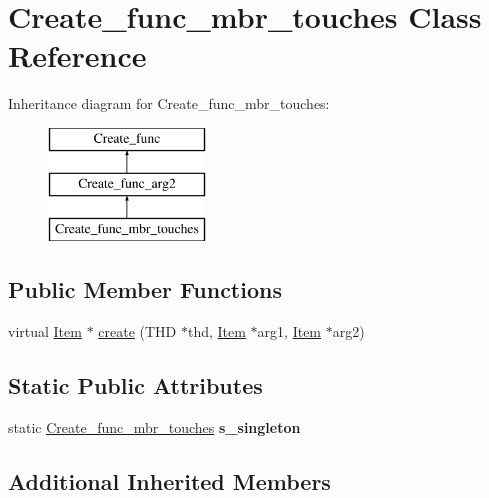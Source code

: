 \hypertarget{classCreate__func__mbr__touches}{}\section{Create\+\_\+func\+\_\+mbr\+\_\+touches Class Reference}
\label{classCreate__func__mbr__touches}
Inheritance diagram for Create\+\_\+func\+\_\+mbr\+\_\+touches\+:\begin{figure}[H]
\begin{center}
\leavevmode
\includegraphics[height=3.000000cm]{classCreate__func__mbr__touches}
\end{center}
\end{figure}
\subsection*{Public Member Functions}
\begin{DoxyCompactItemize}
\item 
virtual \mbox{\hyperlink{classItem}{Item}} $\ast$ \mbox{\hyperlink{classCreate__func__mbr__touches_a9750fb66d00c3a82bb5ce830879625e5}{create}} (T\+HD $\ast$thd, \mbox{\hyperlink{classItem}{Item}} $\ast$arg1, \mbox{\hyperlink{classItem}{Item}} $\ast$arg2)
\end{DoxyCompactItemize}
\subsection*{Static Public Attributes}
\begin{DoxyCompactItemize}
\item 
\mbox{\label{classCreate__func__mbr__touches_aa79ffb46db189bfa10ef0145f79ccd3d}} 
static \mbox{\hyperlink{classCreate__func__mbr__touches}{Create\+\_\+func\+\_\+mbr\+\_\+touches}} {\bfseries s\+\_\+singleton}
\end{DoxyCompactItemize}
\subsection*{Additional Inherited Members}


